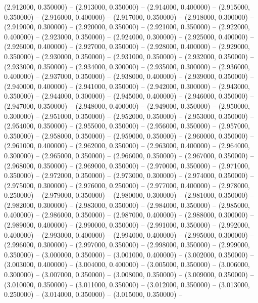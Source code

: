 (2.912000, 0.350000) -- 
(2.913000, 0.350000) -- 
(2.914000, 0.400000) -- 
(2.915000, 0.350000) -- 
(2.916000, 0.400000) -- 
(2.917000, 0.350000) -- 
(2.918000, 0.300000) -- 
(2.919000, 0.300000) -- 
(2.920000, 0.350000) -- 
(2.921000, 0.350000) -- 
(2.922000, 0.400000) -- 
(2.923000, 0.350000) -- 
(2.924000, 0.300000) -- 
(2.925000, 0.400000) -- 
(2.926000, 0.400000) -- 
(2.927000, 0.350000) -- 
(2.928000, 0.400000) -- 
(2.929000, 0.350000) -- 
(2.930000, 0.350000) -- 
(2.931000, 0.350000) -- 
(2.932000, 0.350000) -- 
(2.933000, 0.350000) -- 
(2.934000, 0.300000) -- 
(2.935000, 0.300000) -- 
(2.936000, 0.400000) -- 
(2.937000, 0.350000) -- 
(2.938000, 0.400000) -- 
(2.939000, 0.350000) -- 
(2.940000, 0.400000) -- 
(2.941000, 0.350000) -- 
(2.942000, 0.300000) -- 
(2.943000, 0.350000) -- 
(2.944000, 0.300000) -- 
(2.945000, 0.400000) -- 
(2.946000, 0.350000) -- 
(2.947000, 0.350000) -- 
(2.948000, 0.400000) -- 
(2.949000, 0.350000) -- 
(2.950000, 0.300000) -- 
(2.951000, 0.350000) -- 
(2.952000, 0.350000) -- 
(2.953000, 0.350000) -- 
(2.954000, 0.350000) -- 
(2.955000, 0.350000) -- 
(2.956000, 0.350000) -- 
(2.957000, 0.350000) -- 
(2.958000, 0.350000) -- 
(2.959000, 0.350000) -- 
(2.960000, 0.350000) -- 
(2.961000, 0.400000) -- 
(2.962000, 0.350000) -- 
(2.963000, 0.400000) -- 
(2.964000, 0.300000) -- 
(2.965000, 0.350000) -- 
(2.966000, 0.350000) -- 
(2.967000, 0.350000) -- 
(2.968000, 0.350000) -- 
(2.969000, 0.350000) -- 
(2.970000, 0.350000) -- 
(2.971000, 0.350000) -- 
(2.972000, 0.350000) -- 
(2.973000, 0.300000) -- 
(2.974000, 0.350000) -- 
(2.975000, 0.300000) -- 
(2.976000, 0.250000) -- 
(2.977000, 0.400000) -- 
(2.978000, 0.250000) -- 
(2.979000, 0.350000) -- 
(2.980000, 0.300000) -- 
(2.981000, 0.350000) -- 
(2.982000, 0.300000) -- 
(2.983000, 0.350000) -- 
(2.984000, 0.350000) -- 
(2.985000, 0.400000) -- 
(2.986000, 0.350000) -- 
(2.987000, 0.400000) -- 
(2.988000, 0.300000) -- 
(2.989000, 0.400000) -- 
(2.990000, 0.350000) -- 
(2.991000, 0.350000) -- 
(2.992000, 0.400000) -- 
(2.993000, 0.400000) -- 
(2.994000, 0.400000) -- 
(2.995000, 0.300000) -- 
(2.996000, 0.300000) -- 
(2.997000, 0.350000) -- 
(2.998000, 0.350000) -- 
(2.999000, 0.350000) -- 
(3.000000, 0.350000) -- 
(3.001000, 0.400000) -- 
(3.002000, 0.350000) -- 
(3.003000, 0.400000) -- 
(3.004000, 0.400000) -- 
(3.005000, 0.350000) -- 
(3.006000, 0.300000) -- 
(3.007000, 0.350000) -- 
(3.008000, 0.350000) -- 
(3.009000, 0.350000) -- 
(3.010000, 0.350000) -- 
(3.011000, 0.350000) -- 
(3.012000, 0.350000) -- 
(3.013000, 0.250000) -- 
(3.014000, 0.350000) -- 
(3.015000, 0.350000) -- 
